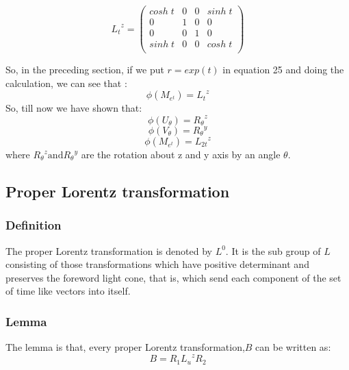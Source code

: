 \begin{equation}
{L_t}^z=
    \begin{pmatrix}
      cosh\;t &0&0&sinh\;t\\
      0&1&0&0\\
      0&0&1&0\\
      sinh\;t &0&0&cosh\;t\\
    \end{pmatrix}
\end{equation}

So, in the preceding section, if we put $r=exp(t)$ in equation 25 and doing the calculation, we can see that :
\begin{equation}
    \phi(M_{e^t})={L_t}^z
\end{equation}
So, till now we have shown that:
\begin{equation}
    \phi(U_{\theta})={R_{\theta}}^z
\end{equation}
\begin{equation}
    \phi(V_{\theta})={R_{\theta}}^y
\end{equation}
\begin{equation}
    \phi(M_{e^t})={L_{2t}}^z
\end{equation}
where ${R_{\theta}}^z \text{and} {R_{\theta}}^y$ are the rotation about z and y axis by an angle $\theta$.





\subsection{Proper Lorentz transformation}


\subsubsection{Definition}
The proper Lorentz transformation is denoted by $L^0$. It is the sub group of $L$ consisting of those transformations which have positive determinant and preserves the foreword light cone, that is, which send each component of the set of time like vectors into itself.


\subsubsection{Lemma}
 The lemma is that, every proper Lorentz transformation,$B$ can be written as:
 \begin{equation}
     B=R_1{L_u}^zR_2
 \end{equation}

